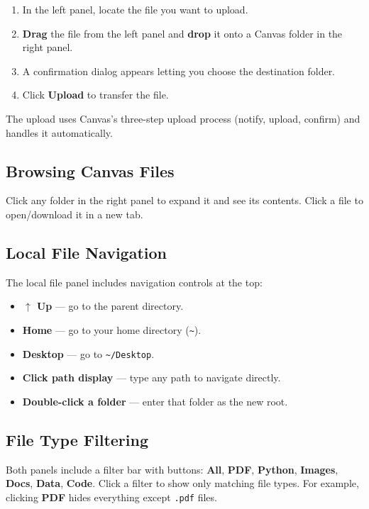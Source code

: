 \documentclass[12pt,letterpaper]{article}
\begin{document}
\begin{enumerate}[leftmargin=*]
    \item In the left panel, locate the file you want to upload.
    \item \textbf{Drag} the file from the left panel and \textbf{drop} it onto a Canvas folder in the right panel.
    \item A confirmation dialog appears letting you choose the destination folder.
    \item Click \textbf{Upload} to transfer the file.
\end{enumerate}

The upload uses Canvas's three-step upload process (notify, upload, confirm) and handles it automatically.

\subsection{Browsing Canvas Files}

Click any folder in the right panel to expand it and see its contents. Click a file to open/download it in a new tab.

\subsection{Local File Navigation}

The local file panel includes navigation controls at the top:
\begin{itemize}[leftmargin=*]
    \item \textbf{$\uparrow$ Up} --- go to the parent directory.
    \item \textbf{Home} --- go to your home directory (\texttt{\textasciitilde}).
    \item \textbf{Desktop} --- go to \texttt{\textasciitilde/Desktop}.
    \item \textbf{Click path display} --- type any path to navigate directly.
    \item \textbf{Double-click a folder} --- enter that folder as the new root.
\end{itemize}

\subsection{File Type Filtering}

Both panels include a filter bar with buttons: \textbf{All}, \textbf{PDF}, \textbf{Python}, \textbf{Images}, \textbf{Docs}, \textbf{Data}, \textbf{Code}. Click a filter to show only matching file types. For example, clicking \textbf{PDF} hides everything except \texttt{.pdf} files.
\end{document}

